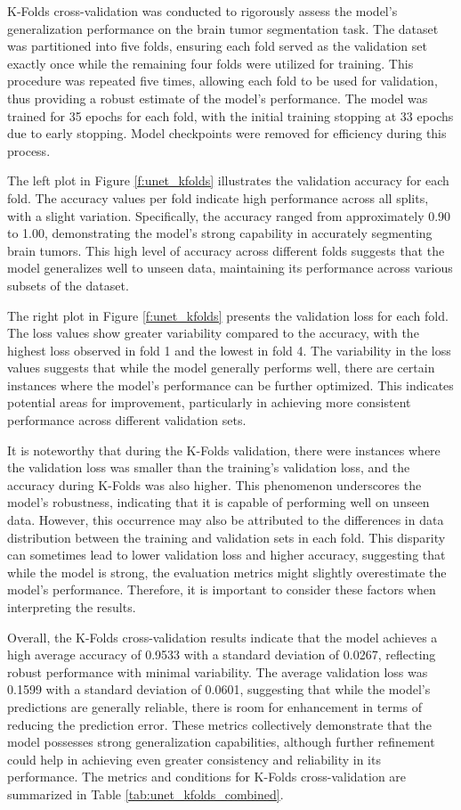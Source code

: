 K-Folds cross-validation was conducted to rigorously assess the model's generalization performance on the brain tumor segmentation task. The dataset was partitioned into five folds, ensuring each fold served as the validation set exactly once while the remaining four folds were utilized for training. This procedure was repeated five times, allowing each fold to be used for validation, thus providing a robust estimate of the model's performance. The model was trained for 35 epochs for each fold, with the initial training stopping at 33 epochs due to early stopping. Model checkpoints were removed for efficiency during this process.

The left plot in Figure \ref{f:unet_kfolds} illustrates the validation accuracy for each fold. The accuracy values per fold indicate high performance across all splits, with a slight variation. Specifically, the accuracy ranged from approximately 0.90 to 1.00, demonstrating the model's strong capability in accurately segmenting brain tumors. This high level of accuracy across different folds suggests that the model generalizes well to unseen data, maintaining its performance across various subsets of the dataset.

The right plot in Figure \ref{f:unet_kfolds} presents the validation loss for each fold. The loss values show greater variability compared to the accuracy, with the highest loss observed in fold 1 and the lowest in fold 4. The variability in the loss values suggests that while the model generally performs well, there are certain instances where the model's performance can be further optimized. This indicates potential areas for improvement, particularly in achieving more consistent performance across different validation sets.

It is noteworthy that during the K-Folds validation, there were instances where the validation loss was smaller than the training's validation loss, and the accuracy during K-Folds was also higher. This phenomenon underscores the model's robustness, indicating that it is capable of performing well on unseen data. However, this occurrence may also be attributed to the differences in data distribution between the training and validation sets in each fold. This disparity can sometimes lead to lower validation loss and higher accuracy, suggesting that while the model is strong, the evaluation metrics might slightly overestimate the model's performance. Therefore, it is important to consider these factors when interpreting the results.

Overall, the K-Folds cross-validation results indicate that the model achieves a high average accuracy of 0.9533 with a standard deviation of 0.0267, reflecting robust performance with minimal variability. The average validation loss was 0.1599 with a standard deviation of 0.0601, suggesting that while the model's predictions are generally reliable, there is room for enhancement in terms of reducing the prediction error. These metrics collectively demonstrate that the model possesses strong generalization capabilities, although further refinement could help in achieving even greater consistency and reliability in its performance. The metrics and conditions for K-Folds cross-validation are summarized in Table \ref{tab:unet_kfolds_combined}.


